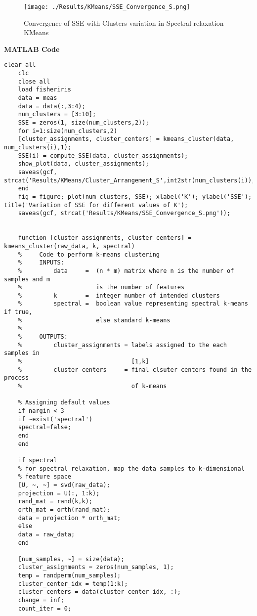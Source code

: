 \documentclass[11pt]{article}
\begin{document}
\begin{figure}[htbp]
	\centering
	\texttt{[image: ./Results/KMeans/SSE\_Convergence\_S.png]}
	\caption{Convergence of SSE with Clusters variation in Spectral relaxation KMeans}
	\label{fig:SSEconvergence}
\end{figure}
\clearpage

\textbf{MATLAB Code}

\begin{lstlisting}[style=Matlab-editor]
	clear all
	clc
	close all
	load fisheriris
	data = meas
	data = data(:,3:4);
	num_clusters = [3:10];
	SSE = zeros(1, size(num_clusters,2));
	for i=1:size(num_clusters,2)
	[cluster_assignments, cluster_centers] = kmeans_cluster(data, num_clusters(i),1);
	SSE(i) = compute_SSE(data, cluster_assignments);
	show_plot(data, cluster_assignments);
	saveas(gcf, strcat('Results/KMeans/Cluster_Arrangement_S',int2str(num_clusters(i)),'.png'));
	end
	fig = figure; plot(num_clusters, SSE); xlabel('K'); ylabel('SSE'); title('Variation of SSE for different values of K');
	saveas(gcf, strcat('Results/KMeans/SSE_Convergence_S.png'));
	
	
	function [cluster_assignments, cluster_centers] = kmeans_cluster(raw_data, k, spectral)
	%     Code to perform k-means clustering
	%     INPUTS:
	%         data     =  (n * m) matrix where n is the number of samples and m
	%                     is the number of features
	%         k        =  integer number of intended clusters
	%         spectral =  boolean value representing spectral k-means if true,
	%                     else standard k-means
	% 
	%     OUTPUTS:
	%         cluster_assignments = labels assigned to the each samples in
	%                               [1,k]
	%         cluster_centers     = final clsuter centers found in the process
	%                               of k-means
	
	% Assigning default values
	if nargin < 3
	if ~exist('spectral')
	spectral=false;
	end
	end
	
	if spectral
	% for spectral relaxation, map the data samples to k-dimensional
	% feature space
	[U, ~, ~] = svd(raw_data);
	projection = U(:, 1:k);
	rand_mat = rand(k,k);
	orth_mat = orth(rand_mat);
	data = projection * orth_mat;
	else
	data = raw_data;
	end
	
	[num_samples, ~] = size(data);
	cluster_assignments = zeros(num_samples, 1);
	temp = randperm(num_samples);
	cluster_center_idx = temp(1:k);
	cluster_centers = data(cluster_center_idx, :);
	change = inf;
	count_iter = 0;
	

\end{lstlisting}
\end{document}
